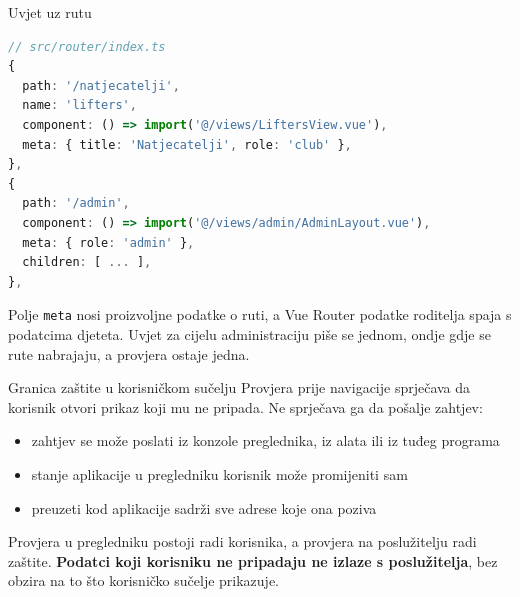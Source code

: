 \begin{frame}[fragile]{Uvjet uz rutu}
\begin{lstlisting}[language=typescript]
// src/router/index.ts
{
  path: '/natjecatelji',
  name: 'lifters',
  component: () => import('@/views/LiftersView.vue'),
  meta: { title: 'Natjecatelji', role: 'club' },
},
{
  path: '/admin',
  component: () => import('@/views/admin/AdminLayout.vue'),
  meta: { role: 'admin' },
  children: [ ... ],
},
\end{lstlisting}

\vspace{0.2em}
Polje \texttt{meta} nosi proizvoljne podatke o ruti, a Vue Router podatke roditelja spaja s podatcima djeteta. Uvjet za cijelu administraciju piše se jednom, ondje gdje se rute nabrajaju, a provjera ostaje jedna.
\end{frame}

\begin{frame}{Granica zaštite u korisničkom sučelju}
Provjera prije navigacije sprječava da korisnik otvori prikaz koji mu ne pripada. Ne sprječava ga da pošalje zahtjev:

\vspace{0.5em}
\begin{itemize}
  \itemsep0.45em
  \item zahtjev se može poslati iz konzole preglednika, iz alata ili iz tuđeg programa
  \item stanje aplikacije u pregledniku korisnik može promijeniti sam
  \item preuzeti kod aplikacije sadrži sve adrese koje ona poziva
\end{itemize}

\vspace{0.7em}
Provjera u pregledniku postoji radi korisnika, a provjera na poslužitelju radi zaštite. \textbf{Podatci koji korisniku ne pripadaju ne izlaze s poslužitelja}, bez obzira na to što korisničko sučelje prikazuje.
\end{frame}

